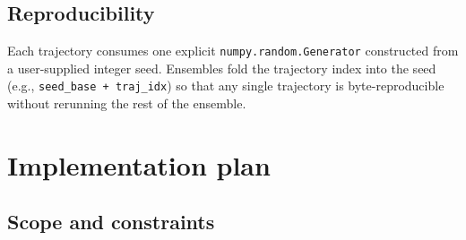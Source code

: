 \documentclass[11pt,a4paper]{article}
\begin{document}
\subsection{Reproducibility}

Each trajectory consumes one explicit \texttt{numpy.random.Generator}
constructed from a user-supplied integer seed. Ensembles fold the
trajectory index into the seed (e.g., \texttt{seed\_base + traj\_idx})
so that any single trajectory is byte-reproducible without rerunning
the rest of the ensemble.

\section{Implementation plan}

\subsection{Scope and constraints}
\end{document}

